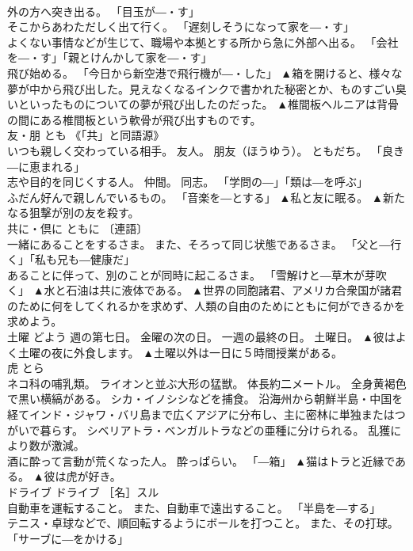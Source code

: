 \documentclass[8pt]{extreport}
\begin{document}
\begin{CJK}{UTF8}{min}
\\	外の方へ突き出る。 「目玉が―・す」 
\\	そこからあわただしく出て行く。 「遅刻しそうになって家を―・す」 
\\	よくない事情などが生じて、職場や本拠とする所から急に外部へ出る。 「会社を―・す」「親とけんかして家を―・す」 
\\	飛び始める。 「今日から新空港で飛行機が―・した」	▲箱を開けると、様々な夢が中から飛び出した。見えなくなるインクで書かれた秘密とか、ものすごい臭いといったものについての夢が飛び出したのだった。 ▲椎間板ヘルニアは背骨の間にある椎間板という軟骨が飛び出すものです。
\\	友・朋	とも	《「共」と同語源》 
\\	いつも親しく交わっている相手。 友人。 朋友（ほうゆう）。 ともだち。 「良き―に恵まれる」 
\\	志や目的を同じくする人。 仲間。 同志。 「学問の―」「類は―を呼ぶ」 
\\	ふだん好んで親しんでいるもの。 「音楽を―とする」	▲私と友に眠る。 ▲新たなる狙撃が別の友を殺す。
\\	共に・倶に	ともに	〔連語〕 
\\	一緒にあることをするさま。 また、そろって同じ状態であるさま。 「父と―行く」「私も兄も―健康だ」 
\\	あることに伴って、別のことが同時に起こるさま。 「雪解けと―草木が芽吹く」	▲水と石油は共に液体である。 ▲世界の同胞諸君、アメリカ合衆国が諸君のために何をしてくれるかを求めず、人類の自由のためにともに何ができるかを求めよう。
\\	土曜	どよう	週の第七日。 金曜の次の日。 一週の最終の日。 土曜日。	▲彼はよく土曜の夜に外食します。 ▲土曜以外は一日に５時間授業がある。
\\	虎	とら	
\\	ネコ科の哺乳類。 ライオンと並ぶ大形の猛獣。 体長約二メートル。 全身黄褐色で黒い横縞がある。 シカ・イノシシなどを捕食。 沿海州から朝鮮半島・中国を経てインド・ジャワ・バリ島まで広くアジアに分布し、主に密林に単独またはつがいで暮らす。 シベリアトラ・ベンガルトラなどの亜種に分けられる。 乱獲により数が激減。 
\\	酒に酔って言動が荒くなった人。 酔っぱらい。 「―箱」	▲猫はトラと近縁である。 ▲彼は虎が好き。
\\	ドライブ	ドライブ	［名］スル 
\\	自動車を運転すること。 また、自動車で遠出すること。 「半島を―する」 
\\	テニス・卓球などで、順回転するようにボールを打つこと。 また、その打球。 「サーブに―をかける」 

\end{CJK}
\end{document}
